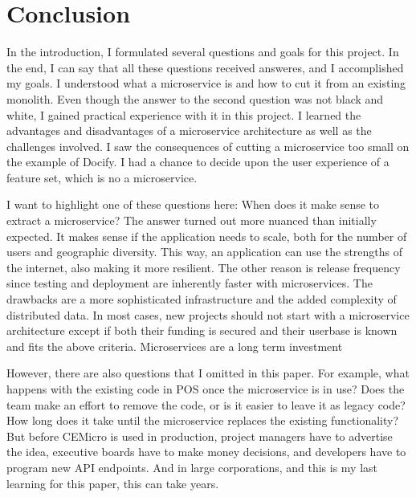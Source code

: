 \chapter{Conclusion}
\label{sec:cunclusion}

In the introduction, I formulated several questions and goals for this project. In the end, I can say that all these questions received answeres, and I accomplished my goals. I understood what a microservice is and how to cut it from an existing monolith. Even though the answer to the second question was not black and white, I gained practical experience with it in this project. I learned the advantages and disadvantages of a microservice architecture as well as the challenges involved. I saw the consequences of cutting a microservice too small on the example of Docify. I had a chance to decide upon the user experience of a feature set, which is no a microservice.

I want to highlight one of these questions here: When does it make sense to extract a microservice? The answer turned out more nuanced than initially expected. It makes sense if the application needs to scale, both for the number of users and geographic diversity. This way, an application can use the strengths of the internet, also making it more resilient. The other reason is release frequency since testing and deployment are inherently faster with microservices. The drawbacks are a more sophisticated infrastructure and the added complexity of distributed data. In most cases, new projects should not start with a microservice architecture except if both their funding is secured and their userbase is known and fits the above criteria. Microservices are a long term investment

However, there are also questions that I omitted in this paper. For example, what happens with the existing code in POS once the microservice is in use? Does the team make an effort to remove the code, or is it easier to leave it as legacy code? How long does it take until the microservice replaces the existing functionality? But before CEMicro is used in production, project managers have to advertise the idea, executive boards have to make money decisions, and developers have to program new API endpoints. And in large corporations, and this is my last learning for this paper, this can take years.

